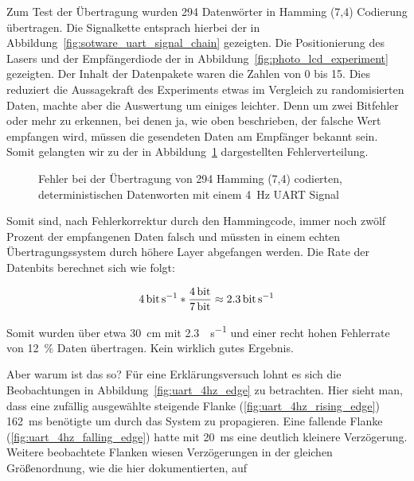\documentclass[12pt,a4paper]{article}
\begin{document}
Zum Test der Übertragung wurden 294 Datenwörter in Hamming (7,4) Codierung übertragen. Die Signalkette entsprach hierbei der in Abbildung~\ref{fig:sotware_uart_signal_chain} gezeigten. Die Positionierung des Lasers und der Empfängerdiode der in Abbildung~\ref{fig:photo_lcd_experiment} gezeigten. Der Inhalt der Datenpakete waren die Zahlen von 0 bis 15. Dies reduziert die Aussagekraft des Experiments etwas im Vergleich zu randomisierten Daten, machte aber die Auswertung um einiges leichter. Denn um zwei Bitfehler oder mehr zu erkennen, bei denen ja, wie oben beschrieben, der falsche Wert empfangen wird, müssen die gesendeten Daten am Empfänger bekannt sein. Somit gelangten wir zu der in Abbildung~\ref{fig:sotware_uart_errors} dargestellten Fehlerverteilung.

\begin{figure}[H]
  \centering
  \caption{Fehler bei der Übertragung von 294 Hamming (7,4) codierten, deterministischen Datenworten mit einem \SI{4}{\hertz} UART Signal}
  \label{fig:sotware_uart_errors}
\end{figure}

Somit sind, nach Fehlerkorrektur durch den Hammingcode, immer noch zwölf Prozent der empfangenen Daten falsch und müssten in einem echten Übertragungssystem durch höhere Layer abgefangen werden. Die Rate der Datenbits berechnet sich wie folgt:

\begin{equation}
 \SI{4}{\bit\per\second} * \frac{\SI{4}{\bit}}{\SI{7}{\bit}} \approx \SI{2.3}{\bit\per\second}
\end{equation}

Somit wurden über etwa \SI{30}{\centi\meter} mit \SI{2.3}{\bit\per\second} und einer recht hohen Fehlerrate von \SI{12}{\percent} Daten übertragen. Kein wirklich gutes Ergebnis.

Aber warum ist das so? Für eine Erklärungsversuch lohnt es sich die Beobachtungen in Abbildung~\ref{fig:uart_4hz_edge} zu betrachten. Hier sieht man, dass eine zufällig ausgewählte steigende Flanke (\ref{fig:uart_4hz_rising_edge})  \SI{162}{\milli\second} benötigte um durch das System zu propagieren. Eine fallende Flanke (\ref{fig:uart_4hz_falling_edge}) hatte mit \SI{20}{\milli\second} eine deutlich kleinere Verzögerung. Weitere beobachtete Flanken wiesen Verzögerungen in der gleichen Größenordnung, wie die hier dokumentierten, auf
\end{document}
